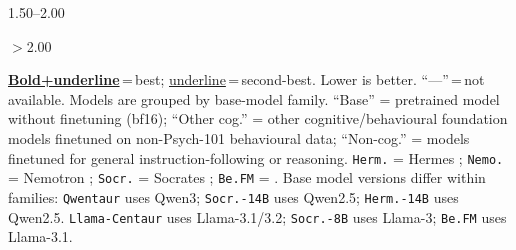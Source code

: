 \begin{table}
\begin{minipage}{\ctrtblwd}
\begin{center}
\colorbox{c8!40}{\strut\hspace{5pt}} \scriptsize 1.50--2.00 \quad
\colorbox{c9!35}{\strut\hspace{5pt}} \scriptsize$>$2.00
\end{center}
\vspace{-2pt}
{\tiny \underline{\textbf{Bold+underline}}\,=\,best; \underline{underline}\,=\,second-best. Lower is better. ``---''\,=\,not available. Models are grouped by base-model family. ``Base'' = pretrained model without finetuning (bf16); ``Other cog.'' = other cognitive/behavioural foundation models finetuned on non-Psych-101 behavioural data; ``Non-cog.'' = models finetuned for general instruction-following or reasoning. \texttt{Herm.} = Hermes \citep{teknium2024hermes3technicalreport}; \texttt{Nemo.} = Nemotron \citep{bercovich2025nemotron}; \texttt{Socr.} = Socrates \citep{kolluri2025finetuning}; \texttt{Be.FM} = \citet{xie2025fm}. Base model versions differ within families: \texttt{Qwentaur} uses Qwen3; \texttt{Socr.-14B} uses Qwen2.5; \texttt{Herm.-14B} uses Qwen2.5. \texttt{Llama-Centaur} uses Llama-3.1/3.2; \texttt{Socr.-8B} uses Llama-3; \texttt{Be.FM} uses Llama-3.1.}
\end{minipage}
\captionsetup{width=\ctrtblwd}
\caption{\textbf{Comparison of cognitively finetuned models with other behavioural foundation models and non-cognitive controls on Psych-101, grouped by base-model family.} Within each family, \texttt{Qwentaur}/\texttt{Llama-Centaur} (cognitive SFT on Psych-101) consistently outperform both other behavioural finetuned models and non-cognitive controls, demonstrating that alignment with human behavioural patterns requires cognitive finetuning on structured experimental data, not merely finetuning per se.}
\label{tab:psych101_pe_control}
\end{table}

